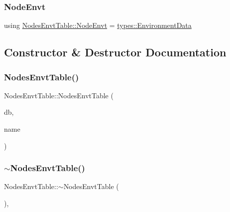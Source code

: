 \subsubsection{\texorpdfstring{NodeEnvt}{NodeEnvt}}
{\footnotesize\ttfamily using \mbox{\hyperlink{class_nodes_envt_table_adbc6a037efe1edee85eab03779c0b151}{Nodes\+Envt\+Table\+::\+Node\+Envt}} =  \mbox{\hyperlink{structtypes_1_1_environment_data}{types\+::\+Environment\+Data}}}



\subsection{Constructor \& Destructor Documentation}
\mbox{\label{class_nodes_envt_table_a93f0ad92d25c9b8978e8b676a20bfb60}} 
\subsubsection{\texorpdfstring{NodesEnvtTable()}{NodesEnvtTable()}}
{\footnotesize\ttfamily Nodes\+Envt\+Table\+::\+Nodes\+Envt\+Table (\begin{DoxyParamCaption}\item[{std\+::shared\+\_\+ptr$<$ sqlite\+::\+S\+Q\+Lite\+Storage $>$}]{db,  }\item[{std\+::string}]{name }\end{DoxyParamCaption})}

\mbox{\label{class_nodes_envt_table_afe10f484b5739e2ec6b71db5383dfbaa}} 
\subsubsection{\texorpdfstring{$\sim$NodesEnvtTable()}{~NodesEnvtTable()}}
{\footnotesize\ttfamily Nodes\+Envt\+Table\+::$\sim$\+Nodes\+Envt\+Table (\begin{DoxyParamCaption}{ }\end{DoxyParamCaption})\hspace{0.3cm}{\ttfamily [default]}, {\ttfamily [noexcept]}}



